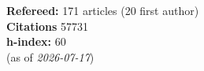 \textbf{Refereed:} 171 articles (20 first author)\\\textbf{Citations} 57731\\\textbf{h-index:} 60\\(as of \textit{2026-07-17})